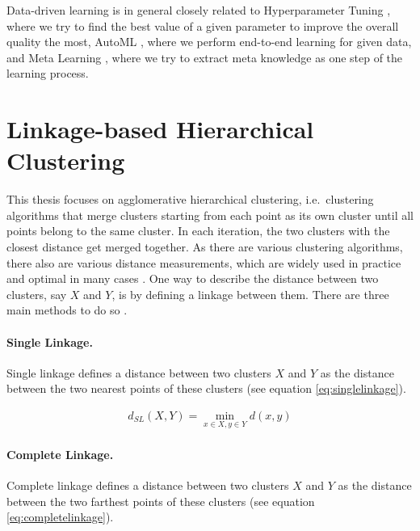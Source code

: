 Data-driven learning is in general closely related to Hyperparameter Tuning \cite{hutter2015beyond}, where we try to find the best value of a given parameter to improve the overall quality the most, AutoML \cite{lacoste2014sequential,liu2018very}, where we perform end-to-end learning for given data, and Meta Learning \cite{alexandros2001model}, where we try to extract meta knowledge as one step of the learning process.

\section{Linkage-based Hierarchical Clustering}

This thesis focuses on agglomerative hierarchical clustering, i.e.\ clustering algorithms that merge clusters starting from each point as its own cluster until all points belong to the same cluster. In each iteration, the two clusters with the closest distance get merged together. As there are various clustering algorithms, there also are various distance measurements, which are widely used in practice and optimal in many cases \cite{awasthi2017local,saeed2003software,white2010alignment,awasthi2012center,balcan2016clustering,grosswendt2017improved}. One way to describe the distance between two clusters, say $X$ and $Y$, is by defining a linkage between them. There are three main methods to do so \cite{Manning:2008:IIR:1394399}.

\paragraph{Single Linkage.}

Single linkage defines a distance between two clusters $X$ and $Y$ as the distance between the two nearest points of these clusters (see equation \ref{eq:singlelinkage}).

\begin{equation}
    \begin{aligned}
        d_{SL}(X,Y) = \min\limits_{x \in X, y \in Y} d(x,y)
    \end{aligned}
    \label{eq:singlelinkage}
\end{equation}

\paragraph{Complete Linkage.}

Complete linkage defines a distance between two clusters $X$ and $Y$ as the distance between the two farthest points of these clusters (see equation \ref{eq:completelinkage}).

